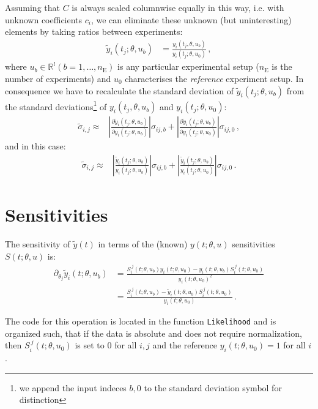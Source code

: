 \documentclass[utf8,english]{scrartcl}
\begin{document}
Assuming that $C$ is always scaled columnwise equally in this way,
i.e.  with unknown coefficients $c_i$, we can eliminate these unknown
(but uninteresting) elements by taking ratios between experiments:
\begin{align}
  \tilde y_i(t_j;\theta,u_b) &=
  \frac{y_i(t_j,\theta,u_b)}{y_i(t_j;\theta,u_0)}\,,
\end{align}
where $u_b\in\mathbb{R}^l (b=1,\dots,n_{\text{E}})$ is any particular
experimental setup ($n_{\text{E}}$ is the number of experiments) and
$u_0$ characterises the \emph{reference} experiment setup.  In
consequence we have to recalculate the standard deviation of $\tilde
y_i(t_j;\theta,u_b)$ from the standard deviations\footnote{we append
  the input indeces $b,0$ to the standard deviation symbol for
  distinction} of ${y_i(t_j,\theta,u_b)}$ and ${y_i(t_j;\theta,u_0)}$:
\begin{align}
  \label{eq:std_y}
  \tilde\sigma_{i,j}\approx&\left|\frac{\partial\tilde
      y_i(t_j;\theta,u_b)}{\partial
      y_i(t_j;\theta,u_b)}\right|\sigma_{ij,b} +
  \left|\frac{\partial\tilde y_i(t_j;\theta,u_b)}{\partial
      y_i(t_j;\theta,u_0)}\right|\sigma_{ij,0}\,,
\end{align}
and in this case:
\begin{align}
  \label{eq:std_yy}
  \tilde\sigma_{i,j}\approx&\left|\frac{\tilde
      y_i(t_j;\theta,u_b)}{y_i(t_j;\theta,u_b)}\right|\sigma_{ij,b} +
  \left|\frac{\tilde
      y_i(t_j;\theta,u_b)}{y_i(t_j;\theta,u_0)}\right|\sigma_{ij,0}\,.
\end{align}


\section{Sensitivities}
\label{sec:sens}

The sensitivity of $\tilde y(t)$ in terms of the (known) $y(t;\theta,u)$ sensitivities $S(t;\theta,u)$ is:
\begin{align}
  \partial_{\theta_j} \tilde y_i(t;\theta,u_b) 
  &= \frac{S_i^{~j}(t;\theta,u_b)y_i(t;\theta,u_0)
    -y_i(t;\theta,u_b)S_i^{~j}(t;\theta,u_0)}{y_i(t;\theta,u_0)^2}\nonumber\\
  &= \frac{S_i^{~j}(t;\theta,u_b) 
    - \tilde y_i(t;\theta,u_b)S_i^{~j}(t;\theta,u_0)}{y_i(t;\theta,u_0)}\,.  \label{eq:fyS}
\end{align}

The code for this operation is located in the function
\texttt{Likelihood} and is organized such, that if the data is
absolute and does not require normalization, then
$S_i^{~j}(t;\theta,u_0)$ is set to $0$ for all $i,j$ and the reference
$y_i(t;\theta,u_0)=1$ for all $i$.
\end{document}

